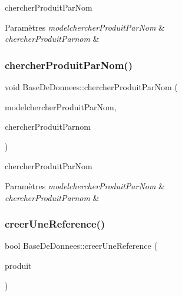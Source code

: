 chercher\+Produit\+Par\+Nom 


\begin{DoxyParams}{Paramètres}
{\em modelchercher\+Produit\+Par\+Nom} & \\
\hline
{\em chercher\+Produit\+Parnom} & \\
\hline
\end{DoxyParams}
\mbox{\label{class_base_de_donnees_a49d9a59025c2342adc820849bffb5532}} 
\subsubsection{\texorpdfstring{chercher\+Produit\+Par\+Nom()}{chercherProduitParNom()}\hspace{0.1cm}{\footnotesize\ttfamily [2/2]}}
{\footnotesize\ttfamily void Base\+De\+Donnees\+::chercher\+Produit\+Par\+Nom (\begin{DoxyParamCaption}\item[{Q\+Sql\+Query\+Model $\ast$}]{modelchercher\+Produit\+Par\+Nom,  }\item[{Q\+String}]{chercher\+Produit\+Parnom }\end{DoxyParamCaption})}



chercher\+Produit\+Par\+Nom 


\begin{DoxyParams}{Paramètres}
{\em modelchercher\+Produit\+Par\+Nom} & \\
\hline
{\em chercher\+Produit\+Parnom} & \\
\hline
\end{DoxyParams}
\mbox{\label{class_base_de_donnees_a48345312e89c6e8fdeec128f033566ee}} 
\subsubsection{\texorpdfstring{creer\+Une\+Reference()}{creerUneReference()}}
{\footnotesize\ttfamily bool Base\+De\+Donnees\+::creer\+Une\+Reference (\begin{DoxyParamCaption}\item[{\mbox{\hyperlink{class_produits}{Produits}} \&}]{produit }\end{DoxyParamCaption})}



